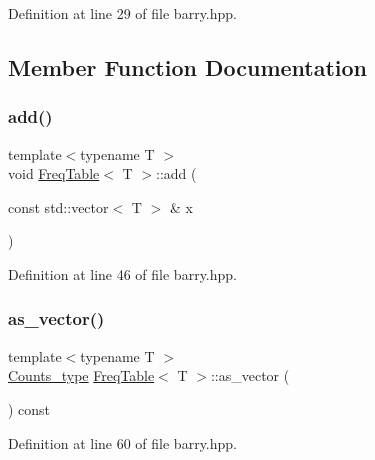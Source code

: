 Definition at line 29 of file barry.\+hpp.



\subsection{Member Function Documentation}
\mbox{\label{classbarry_1_1_freq_table_a919e08556ba3aa9535a64827315bb89a}} 
\subsubsection{\texorpdfstring{add()}{add()}}
{\footnotesize\ttfamily template$<$typename T $>$ \\
void \hyperlink{classbarry_1_1_freq_table}{Freq\+Table}$<$ T $>$\+::add (\begin{DoxyParamCaption}\item[{const std\+::vector$<$ T $>$ \&}]{x }\end{DoxyParamCaption})\hspace{0.3cm}{\ttfamily [inline]}}



Definition at line 46 of file barry.\+hpp.

\mbox{\label{classbarry_1_1_freq_table_a1898e62605d8753e170189936d403e05}} 
\subsubsection{\texorpdfstring{as\+\_\+vector()}{as\_vector()}}
{\footnotesize\ttfamily template$<$typename T $>$ \\
\hyperlink{namespacebarry_a3e2d8c3b6cf602107559d4237d9f1315}{Counts\+\_\+type} \hyperlink{classbarry_1_1_freq_table}{Freq\+Table}$<$ T $>$\+::as\+\_\+vector (\begin{DoxyParamCaption}{ }\end{DoxyParamCaption}) const\hspace{0.3cm}{\ttfamily [inline]}}



Definition at line 60 of file barry.\+hpp.

